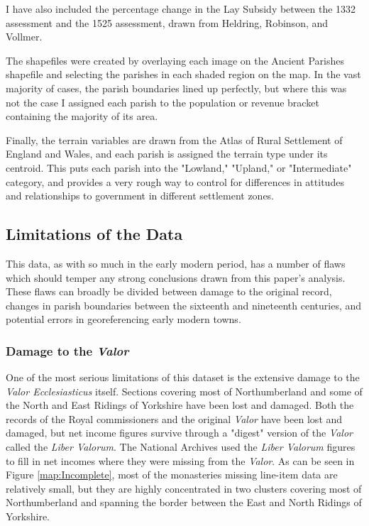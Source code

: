 \documentclass[12pt]{article}
\begin{document}
I have also included the percentage change in the Lay Subsidy between the 1332 assessment and the 1525 assessment, drawn from Heldring, Robinson, and Vollmer.\autocite[2124]{Heldring2021} 

The shapefiles were created by overlaying each image on the Ancient Parishes shapefile and selecting the parishes in each shaded region on the map. In the vast majority of cases, the parish boundaries lined up perfectly, but where this was not the case I assigned each parish to the population or revenue bracket containing the majority of its area.

Finally, the terrain variables are drawn from the Atlas of Rural Settlement of England and Wales, and each parish is assigned the terrain type under its centroid. This puts each parish into the "Lowland," "Upland," or "Intermediate" category, and provides a very rough way to control for differences in attitudes and relationships to government in different settlement zones.

\subsection{Limitations of the Data}

This data, as with so much in the early modern period, has a number of flaws which should temper any strong conclusions drawn from this paper's analysis. These flaws can broadly be divided between damage to the original record, changes in parish boundaries between the sixteenth and nineteenth centuries, and potential errors in georeferencing early modern towns.

\subsubsection{Damage to the \emph{Valor}}


One of the most serious limitations of this dataset is the extensive damage to the \emph{Valor Ecclesiasticus} itself. Sections covering most of Northumberland and some of the North and East Ridings of Yorkshire have been lost and damaged. Both the records of the Royal commissioners and the original \emph{Valor} have been lost and damaged, but net income figures survive through a "digest" version of the \emph{Valor} called the \emph{Liber Valorum}. The National Archives used the \emph{Liber Valorum} figures to fill in net incomes where they were missing from the \emph{Valor}. As can be seen in Figure \ref{map:Incomplete}, most of the monasteries missing line-item data are relatively small, but they are highly concentrated in two clusters covering most of Northumberland and spanning the border between the East and North Ridings of Yorkshire.
\end{document}
